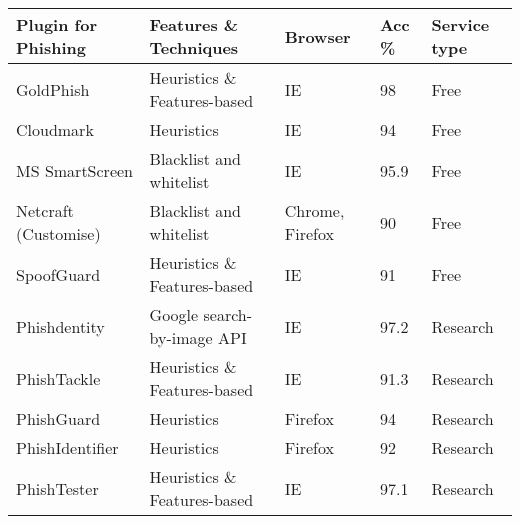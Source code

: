 \begin{singlespace}
    \small
    \begin{center}
        \label{tab:EXISTENT_SOLUTIONS_VS_ARTEFACT}
        \begin{tabular}{ | m{8em} | m{13em} | m{8.5em} | m{2.3em} | m{5em} | }
            \hline
            \textbf{Plugin for Phishing} & \textbf{Features \& Techniques}       & \textbf{Browser}    & \textbf{Acc \%} & \textbf{Service  type} \\
            \hline
            GoldPhish                    & Heuristics \& Features-based          & IE                  & 98              & Free                   \\
            \hline
            Cloudmark                    & Heuristics                            & IE                  & 94              & Free                   \\
            \hline
            MS SmartScreen               & Blacklist and whitelist               & IE                  & 95.9            & Free                   \\
            \hline
            Netcraft (Customise)         & Blacklist and whitelist               & Chrome, Firefox     & 90              & Free                   \\
            \hline
            SpoofGuard                   & Heuristics \& Features-based          & IE                  & 91              & Free                   \\
            \hline
            Phishdentity                 & Google search-by-image API            & IE                  & 97.2            & Research               \\
            \hline
            PhishTackle                  & Heuristics \& Features-based          & IE                  & 91.3            & Research               \\
            \hline
            PhishGuard                   & Heuristics                            & Firefox             & 94              & Research               \\
            \hline
            PhishIdentifier              & Heuristics                            & Firefox             & 92              & Research               \\
            \hline
            PhishTester                  & Heuristics \& Features-based          & IE                  & 97.1            & Research               \\
            \hline

\end{tabular}
\end{center}
\end{singlespace}
